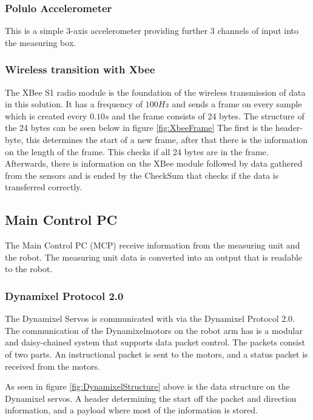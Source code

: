 \subsubsection{Polulo Accelerometer}
This is a simple 3-axis accelerometer providing further 3 channels of input into the measuring box. 
\subsubsection{Wireless transition with Xbee}\label{XbeeExplan}
The XBee S1 radio module is the foundation of the wireless transmission of data in this solution. It has a frequency of $100Hz$ and sends a frame on every sample which is created every $0.10s$ and the frame consists of 24 bytes. The structure of the 24 bytes can be seen below in figure \ref{fig:XbeeFrame}
\label{XbeeDataStruct}
The first is the header-byte, this determines the start of a new frame, after that there is the information on the length of the frame. This checks if all 24 bytes are in the frame. Afterwards, there is information on the XBee module followed by data gathered from the sensors and is ended by the CheckSum that checks if the data is transferred correctly.
\subsection{Main Control PC}
The Main Control PC (MCP) receive information from the measuring unit and the robot. The measuring unit data is converted into an output that is readable to the robot.
\subsubsection{Dynamixel Protocol 2.0}
The Dynamixel Servos is communicated with via the Dynamixel Protocol 2.0.
The communication of the Dynamixelmotors on the robot arm has is a modular and daisy-chained system that supports data packet control. The packets consist of two parts. An instructional packet is sent to the motors, and a status packet is received from the motors. 


As seen in figure \ref{fig:DynamixelStructure} above is the data structure on the Dynamixel servos. A header determining the start off the packet and direction information, and a payload where most of the information is stored. 

